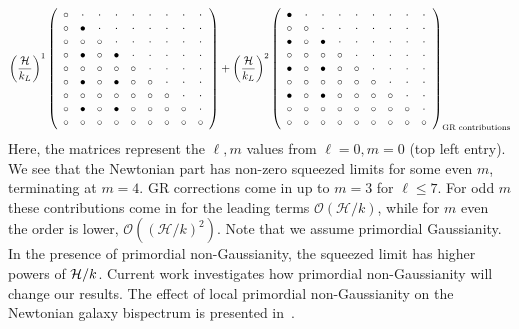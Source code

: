 {\begin{equation}
{ \left(\frac{\mathcal{H}}{k_L}\right)^1\left( \begin {array}{ccccccccc} {\circ }&\cdot &\cdot &\cdot &\cdot &\cdot &\cdot &\cdot &\cdot \\ \circ &\bullet &\cdot &\cdot &\cdot &\cdot &\cdot &\cdot &\cdot \\ {\circ }&\circ &{\circ }&\cdot &\cdot &\cdot &\cdot &\cdot &\cdot \\ \circ &\bullet &\circ &\bullet &\cdot &\cdot &\cdot &\cdot &\cdot \\ {\circ }&\circ &{\circ }&\circ &\circ &\cdot &\cdot &\cdot &\cdot \\ \circ &\bullet &\circ &\bullet &\circ &\circ &\cdot &\cdot &\cdot \\ {\circ }&\circ &{\circ }&\circ &\circ &\circ &\circ &\cdot &\cdot \\ \circ &\bullet &\circ &\bullet &\circ &\circ &\circ &\circ &\cdot \\ \circ &\circ &\circ &\circ &\circ &\circ &\circ &\circ &\circ \end {array} \right) 
+
\left(\frac{\mathcal{H}}{k_L}\right)^2 \left( \begin {array}{ccccccccc} \bullet &\cdot &\cdot &\cdot &\cdot &\cdot &\cdot &\cdot &\cdot \\ \circ &\circ &\cdot &\cdot &\cdot &\cdot &\cdot &\cdot &\cdot \\ \bullet &\circ &\bullet &\cdot &\cdot &\cdot &\cdot &\cdot &\cdot \\ \circ &\circ &\circ &\circ &\cdot &\cdot &\cdot &\cdot &\cdot \\ \bullet &\circ &\bullet &\circ &\circ &\cdot &\cdot &\cdot &\cdot \\ \circ &\circ &\circ &\circ &\circ &\circ &\cdot &\cdot &\cdot \\ \bullet &\circ &\bullet &\circ &\circ &\circ &\circ &\cdot &\cdot \\ \circ &\circ &\circ &\circ &\circ &\circ &\circ &\circ &\cdot \\ \circ &\circ &\circ &\circ &\circ &\circ &\circ &\circ &\circ \end {array} \right) }_\text{GR contributions}
\end{equation}
Here, the matrices represent the $\ell,m$ values from $\ell=0,m=0$ (top left entry). We see that the Newtonian part has non-zero squeezed limits for some even $m$, terminating at $m=4$. GR corrections come in up to $m=3$ for $\ell\leq 7$. For odd $m$ these contributions come in for the leading terms $\mathcal{O}(\mathcal{H}/k)$, while for $m$ even the order is lower, $\mathcal{O}((\mathcal{H}/k)^2)$. Note that we assume primordial Gaussianity. In the presence of primordial non-Gaussianity, the squeezed limit has higher powers of $\mathcal{H}/k$. Current work investigates how primordial non-Gaussianity will change our results. The effect of local primordial non-Gaussianity on the Newtonian galaxy bispectrum is presented in~\cite{Umeh:2016nuh}.


}
